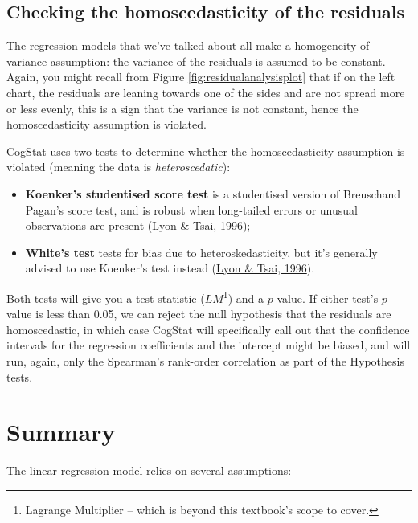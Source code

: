 \documentclass[
]{book}
\providecommand{\tightlist}{%
  \setlength{\itemsep}{0pt}\setlength{\parskip}{0pt}}
\theoremstyle{definition}
\theoremstyle{definition}
\theoremstyle{definition}
\theoremstyle{definition}
\theoremstyle{remark}
\begin{document}
\hypertarget{regressionhomogeneity}{%
\subsection{Checking the homoscedasticity of the residuals}\label{regressionhomogeneity}}

The regression models that we've talked about all make a homogeneity of variance assumption: the variance of the residuals is assumed to be constant. Again, you might recall from Figure \ref{fig:residualanalysisplot} that if on the left chart, the residuals are leaning towards one of the sides and are not spread more or less evenly, this is a sign that the variance is not constant, hence the homoscedasticity assumption is violated.

CogStat uses two tests to determine whether the homoscedasticity assumption is violated (meaning the data is \emph{heteroscedatic}):

\begin{itemize}
\tightlist
\item
  \textbf{Koenker's studentised score test} is a studentised version of Breuschand Pagan's score test, and is robust when long-tailed errors or unusual observations are present (\protect\hyperlink{ref-lyon1996comparison}{Lyon \& Tsai, 1996});
\item
  \textbf{White's test} tests for bias due to heteroskedasticity, but it's generally advised to use Koenker's test instead (\protect\hyperlink{ref-lyon1996comparison}{Lyon \& Tsai, 1996}).
\end{itemize}

Both tests will give you a test statistic (\(LM\)\footnote{Lagrange Multiplier -- which is beyond this textbook's scope to cover.}) and a \(p\)-value. If either test's \(p\)-value is less than 0.05, we can reject the null hypothesis that the residuals are homoscedastic, in which case CogStat will specifically call out that the confidence intervals for the regression coefficients and the intercept might be biased, and will run, again, only the Spearman's rank-order correlation as part of the Hypothesis tests.

\hypertarget{regressionassumptions}{%
\section{Summary}\label{regressionassumptions}}

The linear regression model relies on several assumptions:
\end{document}
